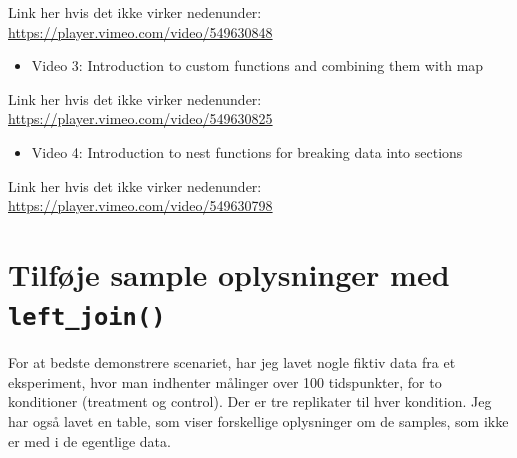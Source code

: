 \documentclass[
]{book}
\providecommand{\tightlist}{%
  \setlength{\itemsep}{0pt}\setlength{\parskip}{0pt}}
\begin{document}
Link her hvis det ikke virker nedenunder: \url{https://player.vimeo.com/video/549630848}

\begin{itemize}
\tightlist
\item
  Video 3: Introduction to custom functions and combining them with map
\end{itemize}

Link her hvis det ikke virker nedenunder: \url{https://player.vimeo.com/video/549630825}

\begin{itemize}
\tightlist
\item
  Video 4: Introduction to nest functions for breaking data into sections
\end{itemize}

Link her hvis det ikke virker nedenunder: \url{https://player.vimeo.com/video/549630798}

\hypertarget{tilfuxf8je-sample-oplysninger-med-left_join}{%
\section{\texorpdfstring{Tilføje sample oplysninger med \texttt{left\_join()}}{Tilføje sample oplysninger med left\_join()}}\label{tilfuxf8je-sample-oplysninger-med-left_join}}

For at bedste demonstrere scenariet, har jeg lavet nogle fiktiv data fra et eksperiment, hvor man indhenter målinger over 100 tidspunkter, for to konditioner (treatment og control). Der er tre replikater til hver kondition. Jeg har også lavet en table, som viser forskellige oplysninger om de samples, som ikke er med i de egentlige data.
\end{document}

